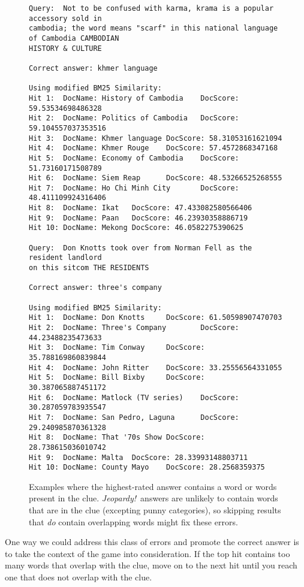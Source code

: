 \documentclass[11pt,letterpaper]{article}
\begin{document}
\begin{figure*}[b]
	\small
\begin{verbatim}
Query:  Not to be confused with karma, krama is a popular accessory sold in
cambodia; the word means "scarf" in this national language of Cambodia CAMBODIAN
HISTORY & CULTURE

Correct answer: khmer language

Using modified BM25 Similarity:
Hit 1:  DocName: History of Cambodia    DocScore: 59.53534698486328
Hit 2:  DocName: Politics of Cambodia   DocScore: 59.104557037353516
Hit 3:  DocName: Khmer language DocScore: 58.31053161621094
Hit 4:  DocName: Khmer Rouge    DocScore: 57.4572868347168
Hit 5:  DocName: Economy of Cambodia    DocScore: 51.73160171508789
Hit 6:  DocName: Siem Reap      DocScore: 48.53266525268555
Hit 7:  DocName: Ho Chi Minh City       DocScore: 48.411109924316406
Hit 8:  DocName: Ikat   DocScore: 47.433082580566406
Hit 9:  DocName: Paan   DocScore: 46.23930358886719
Hit 10: DocName: Mekong DocScore: 46.0582275390625

Query:  Don Knotts took over from Norman Fell as the resident landlord 
on this sitcom THE RESIDENTS

Correct answer: three's company

Using modified BM25 Similarity:
Hit 1:  DocName: Don Knotts     DocScore: 61.50598907470703
Hit 2:  DocName: Three's Company        DocScore: 44.23488235473633
Hit 3:  DocName: Tim Conway     DocScore: 35.788169860839844
Hit 4:  DocName: John Ritter    DocScore: 33.25556564331055
Hit 5:  DocName: Bill Bixby     DocScore: 30.387065887451172
Hit 6:  DocName: Matlock (TV series)    DocScore: 30.287059783935547
Hit 7:  DocName: San Pedro, Laguna      DocScore: 29.240985870361328
Hit 8:  DocName: That '70s Show DocScore: 28.738615036010742
Hit 9:  DocName: Malta  DocScore: 28.33993148803711
Hit 10: DocName: County Mayo    DocScore: 28.2568359375
\end{verbatim}
\normalsize
\caption{Examples where the highest-rated answer contains a word or words present in the clue. \textit{Jeopardy!}~answers are unlikely to contain words that are in the clue (excepting punny categories), so skipping results that \textit{do} contain overlapping words might fix these errors.}
\label{table-repeat}
\end{figure*}


One way we could address this class of errors and promote the correct answer is to take the context of the game into consideration.
If the top hit contains too many words that overlap with the clue, move on to the next hit until you reach one that does not overlap with the clue.
\end{document}
